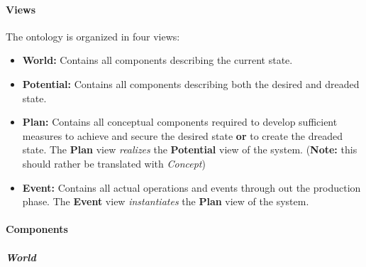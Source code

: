 

\paragraph{Views}

The ontology is organized in four views:

\begin{itemize}
\itemsep1pt\parskip0pt
\item
  \textbf{World:} Contains all components describing the current state.
\item
  \textbf{Potential:} Contains all components describing both the
  desired and dreaded state.
\item
  \textbf{Plan:} Contains all conceptual components required to develop
  sufficient measures to achieve and secure the desired state
  \textbf{or} to create the dreaded state. The \textbf{Plan} view
  \emph{realizes} the \textbf{Potential} view of the system.
  (\textbf{Note:} this should rather be translated with \emph{Concept})
\item
  \textbf{Event:} Contains all actual operations and events through out
  the production phase. The \textbf{Event} view \emph{instantiates} the
  \textbf{Plan} view of the system.
\end{itemize}

\paragraph{Components}

\subparagraph{World}

